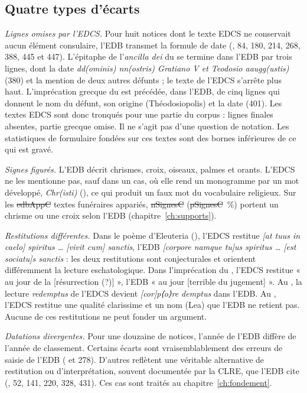 \subsection{Quatre types d’écarts}

\emph{Lignes omises par l’EDCS.} Pour huit notices dont le texte EDCS ne conservait aucun élément consulaire, l’EDB transmet la formule de date (, 84, 180, 214, 268, 388, 445 et 447). L’épitaphe de l’\emph{ancilla dei} du  se termine dans l’EDB par trois lignes, dont la date \emph{dd(ominis) nn(ostris) Gratiano V et Teodosio aaugg(ustis)} (380) et la mention de deux autres défunts ; le texte de l’EDCS s’arrête plus haut. L’imprécation grecque du  est précédée, dans l’EDB, de cinq lignes qui donnent le nom du défunt, son origine (Théodosiopolis) et la date (401). Les textes EDCS sont donc tronqués pour une partie du corpus : lignes finales absentes, partie grecque omise. Il ne s’agit pas d’une question de notation. Les statistiques de formulaire fondées sur ces textes sont des bornes inférieures de ce qui est gravé.

\emph{Signes figurés.} L’EDB décrit chrismes, croix, oiseaux, palmes et orants. L’EDCS ne les mentionne pas, sauf dans un cas, où elle rend un monogramme par un mot développé, \emph{Chr(isti)} (), ce qui produit un faux mot du vocabulaire religieux. Sur les \st{edbAppC} textes funéraires appariés, \st{nSignesC} (\st{pSignesC}~\%) portent un chrisme ou une croix selon l’EDB (chapitre~\ref{ch:supports}).

\emph{Restitutions différentes.} Dans le poème d’Eleuteria (), l’EDCS restitue \emph{[at tuus in caelo] spiritus … [vivit cum] sanctis}, l’EDB \emph{[corpore namque tu]us spiritus … [est sociatu]s sanctis} : les deux restitutions sont conjecturales et orientent différemment la lecture eschatologique. Dans l’imprécation du , l’EDCS restitue « au jour de la [résurrection (?)] », l’EDB « au jour [terrible du jugement] ». Au , la lecture \emph{redemptus} de l’EDCS devient \emph{[cor]p⟨o⟩re demptus} dans l’EDB. Au , l’EDCS restitue une qualité clarissime et un nom (Lea) que l’EDB ne retient pas. Aucune de ces restitutions ne peut fonder un argument.

\emph{Datations divergentes.} Pour une douzaine de notices, l’année de l’EDB diffère de l’année de classement. Certains écarts sont vraisemblablement des erreurs de saisie de l’EDB ( et 278). D’autres reflètent une véritable alternative de restitution ou d’interprétation, souvent documentée par la CLRE, que l’EDB cite (, 52, 141, 220, 328, 431). Ces cas sont traités au chapitre~\ref{ch:fondement}.

